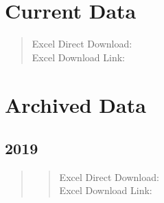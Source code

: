 \documentclass[letterpaper,10pt,english]{sphinxmanual}
\begin{document}
\section{Current Data}
\label{\detokenize{data:current-data}}\begin{quote}\begin{description}
\item[{Excel Direct Download:}] \leavevmode
\sphinxAtStartPar
{}

\item[{Excel Download Link:}] \leavevmode
\sphinxAtStartPar
{}

\end{description}\end{quote}


\section{Archived Data}
\label{\detokenize{data:archived-data}}

\subsection{2019}
\label{\detokenize{data:id1}}\begin{quote}
\begin{quote}\begin{description}
\item[{Excel Direct Download:}] \leavevmode
\sphinxAtStartPar
{}

\item[{Excel Download Link:}] \leavevmode
\sphinxAtStartPar
{}

\end{description}\end{quote}
\end{quote}



\renewcommand{\indexname}{Index}
\printindex
\end{document}
